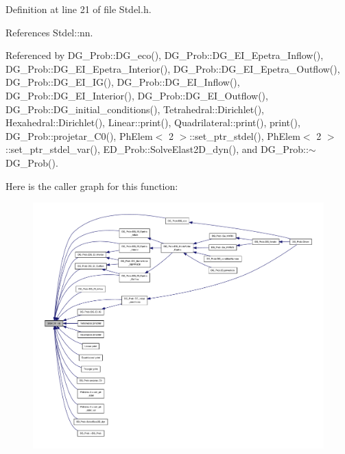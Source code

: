 Definition at line 21 of file Stdel.\+h.



References Stdel\+::nn.



Referenced by D\+G\+\_\+\+Prob\+::\+D\+G\+\_\+eco(), D\+G\+\_\+\+Prob\+::\+D\+G\+\_\+\+E\+I\+\_\+\+Epetra\+\_\+\+Inflow(), D\+G\+\_\+\+Prob\+::\+D\+G\+\_\+\+E\+I\+\_\+\+Epetra\+\_\+\+Interior(), D\+G\+\_\+\+Prob\+::\+D\+G\+\_\+\+E\+I\+\_\+\+Epetra\+\_\+\+Outflow(), D\+G\+\_\+\+Prob\+::\+D\+G\+\_\+\+E\+I\+\_\+\+I\+G(), D\+G\+\_\+\+Prob\+::\+D\+G\+\_\+\+E\+I\+\_\+\+Inflow(), D\+G\+\_\+\+Prob\+::\+D\+G\+\_\+\+E\+I\+\_\+\+Interior(), D\+G\+\_\+\+Prob\+::\+D\+G\+\_\+\+E\+I\+\_\+\+Outflow(), D\+G\+\_\+\+Prob\+::\+D\+G\+\_\+initial\+\_\+conditions(), Tetrahedral\+::\+Dirichlet(), Hexahedral\+::\+Dirichlet(), Linear\+::print(), Quadrilateral\+::print(), print(), D\+G\+\_\+\+Prob\+::projetar\+\_\+\+C0(), Ph\+Elem$<$ 2 $>$\+::set\+\_\+ptr\+\_\+stdel(), Ph\+Elem$<$ 2 $>$\+::set\+\_\+ptr\+\_\+stdel\+\_\+var(), E\+D\+\_\+\+Prob\+::\+Solve\+Elast2\+D\+\_\+dyn(), and D\+G\+\_\+\+Prob\+::$\sim$\+D\+G\+\_\+\+Prob().

Here is the caller graph for this function\+:
\nopagebreak
\begin{figure}[H]
\begin{center}
\leavevmode
\includegraphics[width=350pt]{classStdel_a6086dceed8fe3dd410da0d6b84f02377_icgraph}
\end{center}
\end{figure}
\mbox{\label{classStdel_ae2ab461d1bc8d9f6006665fe03684845}} 
